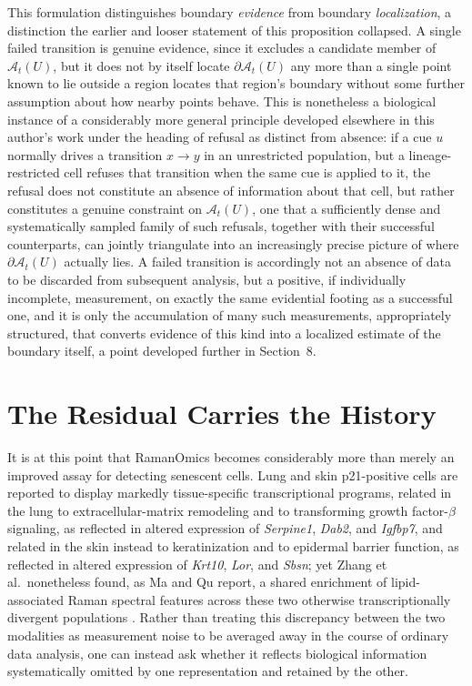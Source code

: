 \documentclass[11pt]{article}
\begin{document}
This formulation distinguishes boundary \emph{evidence} from boundary \emph{localization}, a distinction the earlier and looser statement of this proposition collapsed. A single failed transition is genuine evidence, since it excludes a candidate member of $\mathcal{A}_t(U)$, but it does not by itself locate $\partial \mathcal{A}_t(U)$ any more than a single point known to lie outside a region locates that region's boundary without some further assumption about how nearby points behave. This is nonetheless a biological instance of a considerably more general principle developed elsewhere in this author's work under the heading of refusal as distinct from absence: if a cue $u$ normally drives a transition $x \to y$ in an unrestricted population, but a lineage-restricted cell refuses that transition when the same cue is applied to it, the refusal does not constitute an absence of information about that cell, but rather constitutes a genuine constraint on $\mathcal{A}_t(U)$, one that a sufficiently dense and systematically sampled family of such refusals, together with their successful counterparts, can jointly triangulate into an increasingly precise picture of where $\partial \mathcal{A}_t(U)$ actually lies. A failed transition is accordingly not an absence of data to be discarded from subsequent analysis, but a positive, if individually incomplete, measurement, on exactly the same evidential footing as a successful one, and it is only the accumulation of many such measurements, appropriately structured, that converts evidence of this kind into a localized estimate of the boundary itself, a point developed further in Section~8.

\section{The Residual Carries the History}

It is at this point that RamanOmics becomes considerably more than merely an improved assay for detecting senescent cells. Lung and skin p21-positive cells are reported to display markedly tissue-specific transcriptional programs, related in the lung to extracellular-matrix remodeling and to transforming growth factor-$\beta$ signaling, as reflected in altered expression of \emph{Serpine1}, \emph{Dab2}, and \emph{Igfbp7}, and related in the skin instead to keratinization and to epidermal barrier function, as reflected in altered expression of \emph{Krt10}, \emph{Lor}, and \emph{Sbsn}; yet Zhang et al.\ nonetheless found, as Ma and Qu report, a shared enrichment of lipid-associated Raman spectral features across these two otherwise transcriptionally divergent populations \cite{zhang2026,maqu2026}. Rather than treating this discrepancy between the two modalities as measurement noise to be averaged away in the course of ordinary data analysis, one can instead ask whether it reflects biological information systematically omitted by one representation and retained by the other.
\end{document}
